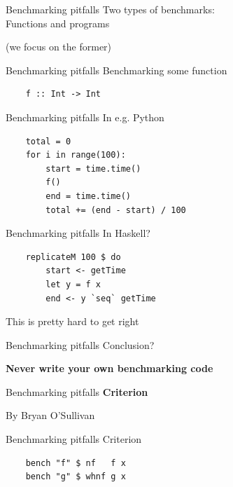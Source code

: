 \documentclass[20pt]{beamer}
\newcommand{\vspaced}{
    \vspace{5mm}
}
\begin{document}
\begin{frame}{Benchmarking pitfalls}
    Two types of benchmarks: \\
    Functions and programs \\
    \vspaced
    (we focus on the former)
\end{frame}

\begin{frame}[fragile]{Benchmarking pitfalls}
    Benchmarking some function

    \begin{lstlisting}
    f :: Int -> Int
    \end{lstlisting}
\end{frame}

\begin{frame}[fragile]{Benchmarking pitfalls}
    In e.g. Python
    \vspaced
    \begin{lstlisting}
    total = 0
    for i in range(100):
        start = time.time()
        f()
        end = time.time()
        total += (end - start) / 100
    \end{lstlisting}
\end{frame}

\begin{frame}[fragile]{Benchmarking pitfalls}
    In Haskell?
    \vspaced
    \begin{lstlisting}
    replicateM 100 $ do
        start <- getTime
        let y = f x
        end <- y `seq` getTime
    \end{lstlisting}
    \vspaced
    This is pretty hard to get right
\end{frame}

\begin{frame}{Benchmarking pitfalls}
    Conclusion? \\
    \vspaced
    \textbf{Never write your own benchmarking code}
\end{frame}

\begin{frame}{Benchmarking pitfalls}
    \textbf{Criterion} \\
    \vspaced
    By Bryan O'Sullivan
\end{frame}

\begin{frame}[fragile]{Benchmarking pitfalls}
    Criterion \\
    \vspaced
    \begin{lstlisting}
    bench "f" $ nf   f x
    bench "g" $ whnf g x
    \end{lstlisting}
\end{frame}
\end{document}
